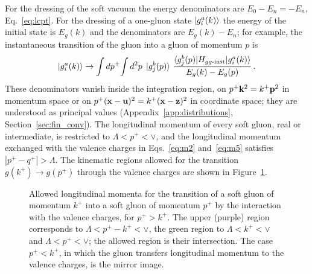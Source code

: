 For the dressing of the soft vacuum the energy denominators are $E_0-E_n=-E_n$, Eq.~\eqref{eq:lcpt}. For the dressing of a one-gluon state $\ket{g^a_i(k)}$ the energy of the initial state is $E_g(k)$ and the denominators are $E_g(k)-E_n$; for example, the instantaneous transition of the gluon into a gluon of momentum $p$ is
\begin{align}
\ket{g^a_i(k)}\to\int dp^+\!\int d^2p\;\ket{g^b_j(p)}\,\frac{\braket{g^b_j(p)|H_{gg\text{-inst}}|g^a_i(k)}}{E_g(k)-E_g(p)}\,.
\end{align}
These denominators vanish inside the integration region, on $p^+\mathbf{k}^2=k^+\mathbf{p}^2$ in momentum space or on $p^+(\mathbf{x}-\mathbf{u})^2=k^+(\mathbf{x}-\mathbf{z})^2$ in coordinate space; they are understood as principal values (Appendix~\ref{app:distributions}, Section~\ref{sec:fin_conv}). The longitudinal momentum of every soft gluon, real or intermediate, is restricted to $\Lambda<p^+<\vee$, and the longitudinal momentum exchanged with the valence charges in Eqs.~\eqref{eq:m2} and~\eqref{eq:m5} satisfies $|p^+-q^+|>\Lambda$. The kinematic regions allowed for the transition $g(k^+)\to g(p^+)$ through the valence charges are shown in Figure~\ref{fig:kinem}.

\begin{figure}[t]
\centering
{}
\caption{Allowed longitudinal momenta for the transition of a soft gluon of momentum $k^+$ into a soft gluon of momentum $p^+$ by the interaction with the valence charges, for $p^+>k^+$. The upper (purple) region corresponds to $\Lambda<p^+-k^+<\vee$, the green region to $\Lambda<k^+<\vee$ and $\Lambda<p^+<\vee$; the allowed region is their intersection. The case $p^+<k^+$, in which the gluon transfers longitudinal momentum to the valence charges, is the mirror image.}
\label{fig:kinem}
\end{figure}

